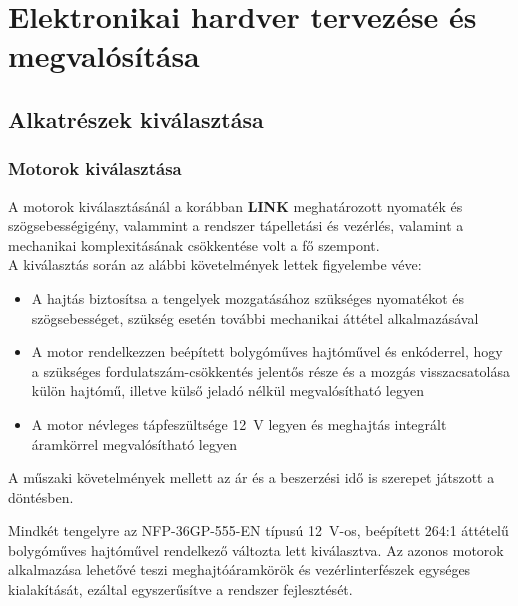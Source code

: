 \chapter{Elektronikai hardver tervezése és megvalósítása}
\label{chap:elektronikai-hardver}
\section{Alkatrészek kiválasztása}
\label{sec:alkatreszek-kivalasztasa}
\subsection{Motorok kiválasztása}
\label{subsec:motorok-kiválasztása}

A motorok kiválasztásánál a korábban \textbf{LINK} meghatározott nyomaték és szögsebességigény, 
valammint a rendszer tápelletási és vezérlés, valamint a mechanikai komplexitásának csökkentése volt a fő szempont. \\
A kiválasztás során az alábbi követelmények lettek figyelembe véve:
\begin{itemize}
    \item A hajtás biztosítsa a tengelyek mozgatásához
    szükséges nyomatékot és szögsebességet, szükség esetén
    további mechanikai áttétel alkalmazásával
    \item A motor rendelkezzen beépített bolygóműves
    hajtóművel és enkóderrel, hogy a szükséges
    fordulatszám-csökkentés jelentős része és a mozgás
    visszacsatolása külön hajtómű, illetve külső jeladó
    nélkül megvalósítható legyen
    \item A motor névleges tápfeszültsége 12~V legyen és meghajtás 
    integrált áramkörrel megvalósítható legyen
\end{itemize}
A műszaki követelmények mellett az ár és a beszerzési idő is szerepet játszott a döntésben.

Mindkét tengelyre az NFP-36GP-555-EN típusú 12~V-os, beépített 264:1 áttételű bolygóműves 
hajtóművel rendelkező változta lett kiválasztva.  
Az azonos motorok alkalmazása lehetővé teszi meghajtóáramkörök és vezérlinterfészek egységes kialakítását,
ezáltal egyszerűsítve a rendszer fejlesztését. \cite{nfp36gp555}\\

